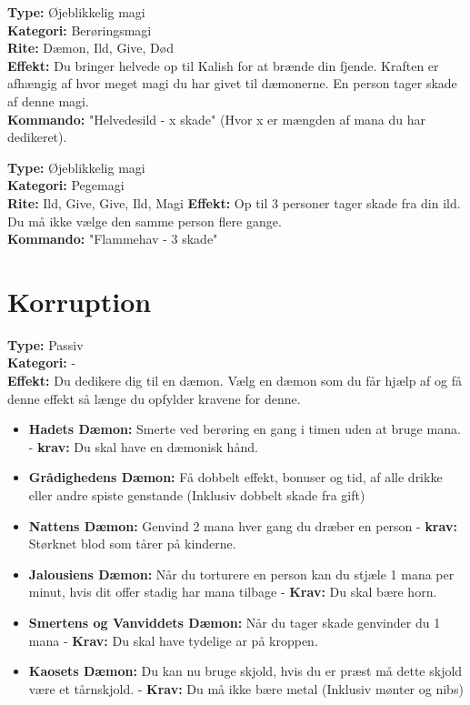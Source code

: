 \begin{dHævn*}
\textbf{Type:} Øjeblikkelig magi\\
\textbf{Kategori:} Berøringsmagi\\
\textbf{Rite:} Dæmon, Ild, Give, Død\\
\textbf{Effekt:} Du bringer helvede op til Kalish for at brænde din fjende. Kraften er afhængig af hvor meget magi du har givet til dæmonerne. En person tager skade af denne magi.\\
\textbf{Kommando:} "Helvedesild - x skade" (Hvor x er mængden af mana du har dedikeret).
\end{dHævn*}

\begin{dHævn*}[Flammehav]
\textbf{Type:} Øjeblikkelig magi\\
\textbf{Kategori:} Pegemagi\\
\textbf{Rite:} Ild, Give, Give, Ild, Magi
\textbf{Effekt:} Op til 3 personer tager skade fra din ild. Du må ikke vælge den samme person flere gange.\\
\textbf{Kommando:} "Flammehav - 3 skade"
\end{dHævn*}

\section{Korruption}
\begin{korruption*}
\textbf{Type:} Passiv\\
\textbf{Kategori:} -\\
\textbf{Effekt:} Du dedikere dig til en dæmon. Vælg en dæmon som du får hjælp af og få denne effekt så længe du opfylder kravene for denne.
\begin{itemize}
    \item \textbf{Hadets Dæmon:} Smerte ved berøring en gang i timen uden at bruge mana. - \textbf{krav:} Du skal have en dæmonisk hånd.
    \item \textbf{Grådighedens Dæmon:} Få dobbelt effekt, bonuser og tid, af alle drikke eller andre spiste genstande (Inklusiv dobbelt skade fra gift)
    \item \textbf{Nattens Dæmon:} Genvind 2 mana hver gang du dræber en person - \textbf{krav:} Størknet blod som tårer på kinderne.
    \item \textbf{Jalousiens Dæmon:} Når du torturere en person kan du stjæle 1 mana per minut, hvis dit offer stadig har mana tilbage - \textbf{Krav:} Du skal bære horn.
    \item \textbf{Smertens og Vanviddets Dæmon:} Når du tager skade genvinder du 1 mana - \textbf{Krav:} Du skal have tydelige ar på kroppen.
    \item \textbf{Kaosets Dæmon:} Du kan nu bruge skjold, hvis du er præst må dette skjold være et tårnskjold. - \textbf{Krav:} Du må ikke bære metal (Inklusiv mønter og nibs)
\end{itemize}
\end{korruption*}

